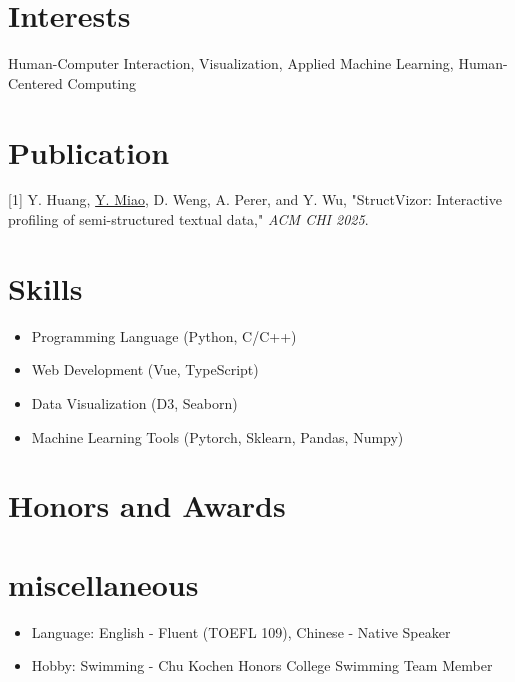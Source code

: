 \documentclass{resume}
\begin{document}
\section{Interests}
Human-Computer Interaction, Visualization, Applied Machine Learning, Human-Centered Computing

\section{Publication}
{[1] Y. Huang, \uline{Y. Miao}, D. Weng, A. Perer, and Y. Wu, "StructVizor: Interactive profiling of
semi-structured textual data," \textit{ACM CHI 2025}.}


\section{Skills}
\begin{itemize}[parsep=0.5ex]
    \item Programming Language (Python, C/C++)
    \item Web Development (Vue, TypeScript)
    \item Data Visualization (D3, Seaborn)
    \item Machine Learning Tools (Pytorch, Sklearn, Pandas, Numpy)
\end{itemize}

\section{Honors and Awards}

\section{miscellaneous}
\begin{itemize}[parsep=0.5ex]
  \item Language: English - Fluent (TOEFL 109), Chinese - Native Speaker
  \item Hobby: Swimming - Chu Kochen Honors College Swimming Team Member
\end{itemize}

%
%
\end{document}
